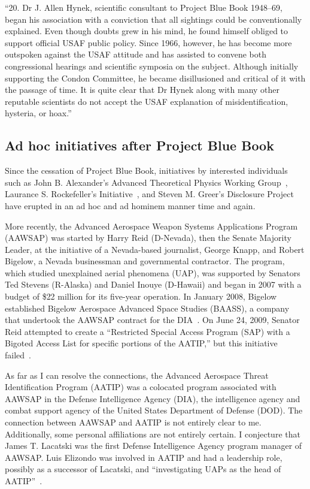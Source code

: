 \begin{svgraybox}
``20. Dr J. Allen Hynek, scientific consultant to Project Blue
Book 1948--69, began his association with a conviction that all
sightings could be conventionally explained. Even though doubts
grew in his mind, he found himself obliged to support official USAF
public policy. Since 1966, however, he has become more outspoken
against the USAF attitude and has assisted to convene both
congressional hearings and scientific symposia on the subject.
Although initially supporting the Condon Committee, he became
disillusioned and critical of it with the passage of time. It is
quite clear that Dr Hynek along with many other reputable scientists
do not accept the USAF explanation of misidentification, hysteria, or
hoax.''
\end{svgraybox}


\subsection{Ad hoc initiatives after Project Blue Book}
\label{2023-UFO-part-Perception-types-USA-ahpbbera}

Since the cessation of Project Blue Book, initiatives by interested individuals
such as John B. Alexander's Advanced Theoretical Physics Working Group~\cite{Alexander2023Jan,Omega_Point2022Nov},
Laurance S. Rockefeller's Initiative~\cite{Berliner2000Jun}, and Steven M. Greer's Disclosure Project~\cite{Greer-dp}
have erupted in an ad hoc and ad hominem manner time and again.

More recently, the Advanced Aerospace Weapon Systems Applications Program (AAWSAP) was started by Harry Reid (D-Nevada),
then the Senate Majority Leader, at the initiative of a Nevada-based journalist, George Knapp, and Robert Bigelow, a Nevada businessman and governmental contractor. The program, which studied unexplained aerial phenomena (UAP), was supported by Senators Ted Stevens (R-Alaska) and Daniel Inouye (D-Hawaii) and began in 2007 with a budget of {\$}22 million for its five-year operation. In January 2008, Bigelow established Bigelow Aerospace Advanced Space Studies (BAASS), a company that undertook the AAWSAP contract for the DIA~\cite{Lacatski-2021}. On June 24, 2009, Senator Reid attempted to create a ``Restricted Special Access Program (SAP) with a Bigoted Access List for specific portions of the AATIP,'' but this initiative failed~\cite{Lacatski-2021}.

As far as I can resolve the connections, the Advanced Aerospace Threat Identification Program (AATIP) was a colocated program associated with AAWSAP in the Defense Intelligence Agency (DIA), the intelligence agency and combat support agency of the United States Department of Defense (DOD). The connection between AAWSAP and AATIP is not entirely clear to me. Additionally, some personal affiliations are not entirely certain. I conjecture that James T. Lacatski was the first Defense Intelligence Agency program manager of AAWSAP. Luis Elizondo was involved in AATIP and had a leadership role, possibly as a successor of Lacatski, and ``investigating UAPs as the head of AATIP''~\cite{ReidLetterApril2021}.

